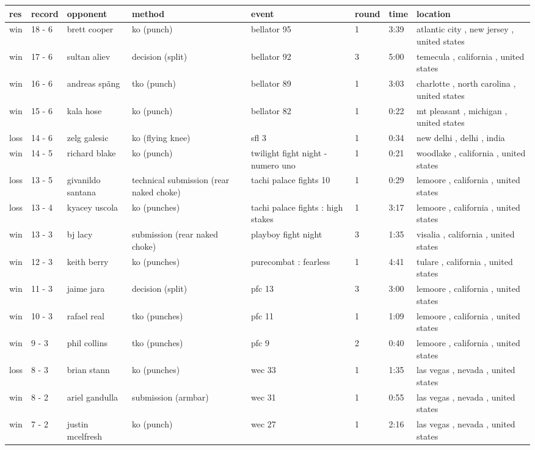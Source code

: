 \documentclass{article}
\begin{document}
\begin{tabular}{llllllll}
\toprule
res & record & opponent & method & event & round & time & location \\
\midrule
win & 18 - 6 & brett cooper & ko (punch) & bellator 95 & 1 & 3:39 & atlantic city , new jersey , united states \\
win & 17 - 6 & sultan aliev & decision (split) & bellator 92 & 3 & 5:00 & temecula , california , united states \\
win & 16 - 6 & andreas spãng & tko (punch) & bellator 89 & 1 & 3:03 & charlotte , north carolina , united states \\
win & 15 - 6 & kala hose & ko (punch) & bellator 82 & 1 & 0:22 & mt pleasant , michigan , united states \\
loss & 14 - 6 & zelg galesic & ko (flying knee) & sfl 3 & 1 & 0:34 & new delhi , delhi , india \\
win & 14 - 5 & richard blake & ko (punch) & twilight fight night - numero uno & 1 & 0:21 & woodlake , california , united states \\
loss & 13 - 5 & givanildo santana & technical submission (rear naked choke) & tachi palace fights 10 & 1 & 0:29 & lemoore , california , united states \\
loss & 13 - 4 & kyacey uscola & ko (punches) & tachi palace fights : high stakes & 1 & 3:17 & lemoore , california , united states \\
win & 13 - 3 & bj lacy & submission (rear naked choke) & playboy fight night & 3 & 1:35 & visalia , california , united states \\
win & 12 - 3 & keith berry & ko (punches) & purecombat : fearless & 1 & 4:41 & tulare , california , united states \\
win & 11 - 3 & jaime jara & decision (split) & pfc 13 & 3 & 3:00 & lemoore , california , united states \\
win & 10 - 3 & rafael real & tko (punches) & pfc 11 & 1 & 1:09 & lemoore , california , united states \\
win & 9 - 3 & phil collins & tko (punches) & pfc 9 & 2 & 0:40 & lemoore , california , united states \\
loss & 8 - 3 & brian stann & ko (punches) & wec 33 & 1 & 1:35 & las vegas , nevada , united states \\
win & 8 - 2 & ariel gandulla & submission (armbar) & wec 31 & 1 & 0:55 & las vegas , nevada , united states \\
win & 7 - 2 & justin mcelfresh & ko (punch) & wec 27 & 1 & 2:16 & las vegas , nevada , united states \\

\end{tabular}
\end{document}
